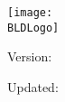 
\thispagestyle{empty}
\begin{titlepage}
  \begin{center}
    \vspace*{2cm}

    \ifdefined\BLDLogo
      \makeatletter\providecommand{\bldIfNonempty}[3]{\edef\@tempa{#1}\ifx\@tempa\empty #2\else #3\fi}\makeatother
      \bldIfNonempty{\BLDLogo}{}{\texttt{[image: \\BLDLogo]}\par\vspace{1.5cm}}%
    \fi

    {\Large \textbf{\BLDTitle}\par}
    \vspace{0.75cm}

    \ifdefined\BLDVersion
      \ifx\BLDVersion\empty
      \else
        {\large Version: \BLDVersion\par}
        \vspace{0.25cm}
      \fi
    \fi

    \ifdefined\BLDUpdated
      \ifx\BLDUpdated\empty
      \else
        {\normalsize Updated: \BLDUpdated\par}
      \fi
    \fi

    \vfill
  \end{center}
\end{titlepage}
